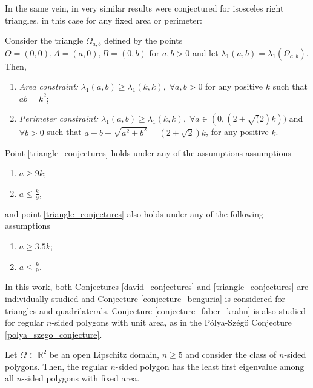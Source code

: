 In the same vein, in \cite{vu2023spectral} very similar results were conjectured for isosceles right triangles, in this case for any fixed area or perimeter:

\begin{conjecture}\label{triangle_conjectures}
    Consider the triangle \(\Omega_{a, b}\) defined by the points \(O=(0, 0), A=(a, 0), B=(0, b)\) for \(a, b>0\) and let \(\lambda_1(a, b) = \lambda_1(\Omega_{a, b})\). Then,
    \begin{enumerate}
        \item \textit{Area constraint: } \(\lambda_1(a, b) \geq \lambda_1(k, k),\; \forall a, b>0\) for any positive \(k\) such that \(ab=k^2\);
        \item \textit{Perimeter constraint: } \(\lambda_1(a, b) \geq \lambda_1(k, k),\; \forall a \in (0, (2+\sqrt(2)k))\) and \(\forall b > 0\) such that \(a+b+\sqrt{a^2+b^2}=(2+\sqrt{2})k\), for any positive \(k\).
    \end{enumerate}
    Point \ref{triangle_conjectures} holds under any of the assumptions assumptions
    \begin{enumerate}
        \item \(a \geq 9k\);
        \item \(a \leq \frac{k}{9}\),
    \end{enumerate}
    and point \ref{triangle_conjectures} also holds under any of the following assumptions
    \begin{enumerate}
        \item \(a \geq 3.5k\);
        \item \(a \leq \frac{k}{9}\).
    \end{enumerate}
\end{conjecture}

In this work, both Conjectures \ref{david_conjectures} and \ref{triangle_conjectures} are individually studied and Conjecture \ref{conjecture_benguria} is considered for triangles and quadrilaterals. Conjecture \ref{conjecture_faber_krahn} is also studied for regular \(n\)-sided polygons with unit area, as in the Pólya-Szég\H{o} Conjecture \ref{polya_szego_conjecture}.

\begin{conjecture}\label{polya_szego_conjecture_dirac}
    Let \(\Omega \subset \mathbb{R}^2\) be an open Lipschitz domain, \(n \geq 5\) and consider the class of \(n\)-sided polygons. Then, the regular \(n\)-sided polygon has the least first eigenvalue among all \(n\)-sided polygons with fixed area.
\end{conjecture}

